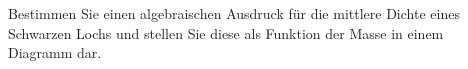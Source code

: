 Bestimmen Sie einen algebraischen Ausdruck für die mittlere Dichte eines Schwarzen Lochs und stellen Sie diese als Funktion der Masse in einem Diagramm dar.
